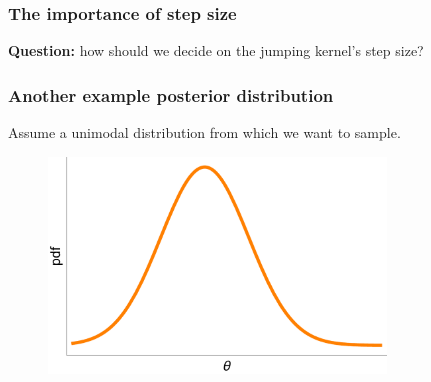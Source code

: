\documentclass[handout]{beamer}
\begin{document}
\begin{frame}
\frametitle{The importance of step size}
\textbf{Question:} how should we decide on the jumping kernel's step size?


\end{frame}

\begin{frame}
\frametitle{Another example posterior distribution}
Assume a unimodal distribution from which we want to sample.

\begin{figure}[ht]
\centerline{\includegraphics[width=0.8\textwidth]{./Figures/lec4_stepSizeStart1.pdf}}
\end{figure}

\end{frame}
\end{document}
